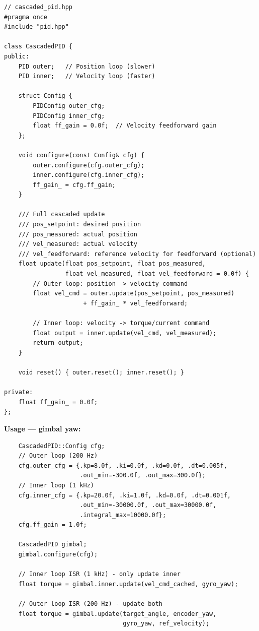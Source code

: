 \begin{verbatim}
// cascaded_pid.hpp
#pragma once
#include "pid.hpp"

class CascadedPID {
public:
    PID outer;   // Position loop (slower)
    PID inner;   // Velocity loop (faster)

    struct Config {
        PIDConfig outer_cfg;
        PIDConfig inner_cfg;
        float ff_gain = 0.0f;  // Velocity feedforward gain
    };

    void configure(const Config& cfg) {
        outer.configure(cfg.outer_cfg);
        inner.configure(cfg.inner_cfg);
        ff_gain_ = cfg.ff_gain;
    }

    /// Full cascaded update
    /// pos_setpoint: desired position
    /// pos_measured: actual position
    /// vel_measured: actual velocity
    /// vel_feedforward: reference velocity for feedforward (optional)
    float update(float pos_setpoint, float pos_measured,
                 float vel_measured, float vel_feedforward = 0.0f) {
        // Outer loop: position -> velocity command
        float vel_cmd = outer.update(pos_setpoint, pos_measured)
                      + ff_gain_ * vel_feedforward;

        // Inner loop: velocity -> torque/current command
        float output = inner.update(vel_cmd, vel_measured);
        return output;
    }

    void reset() { outer.reset(); inner.reset(); }

private:
    float ff_gain_ = 0.0f;
};
\end{verbatim}

\textbf{Usage --- gimbal yaw:}
\begin{verbatim}
    CascadedPID::Config cfg;
    // Outer loop (200 Hz)
    cfg.outer_cfg = {.kp=8.0f, .ki=0.0f, .kd=0.0f, .dt=0.005f,
                     .out_min=-300.0f, .out_max=300.0f};
    // Inner loop (1 kHz)
    cfg.inner_cfg = {.kp=20.0f, .ki=1.0f, .kd=0.0f, .dt=0.001f,
                     .out_min=-30000.0f, .out_max=30000.0f,
                     .integral_max=10000.0f};
    cfg.ff_gain = 1.0f;

    CascadedPID gimbal;
    gimbal.configure(cfg);

    // Inner loop ISR (1 kHz) - only update inner
    float torque = gimbal.inner.update(vel_cmd_cached, gyro_yaw);

    // Outer loop ISR (200 Hz) - update both
    float torque = gimbal.update(target_angle, encoder_yaw,
                                 gyro_yaw, ref_velocity);
\end{verbatim}


